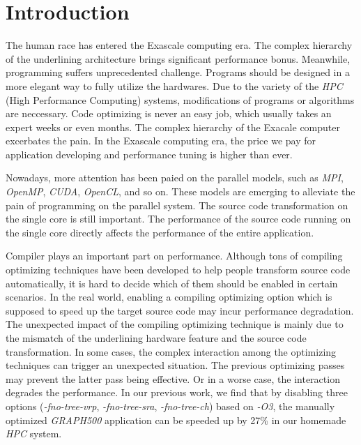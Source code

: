 \documentclass[bst/sn-mathphys]{sn-jnl}%
\theoremstyle{thmstyleone}%
\theoremstyle{thmstyletwo}%
\theoremstyle{thmstylethree}%
\begin{document}
\section{Introduction}\label{sec1}

The human race has entered the Exascale computing era. The complex hierarchy of 
the underlining architecture brings significant performance bonus. Meanwhile, 
programming suffers unprecedented challenge. Programs should be designed in 
a more elegant way to fully utilize the hardwares. Due to the
variety of the \emph{HPC} (High Performance Computing) systems, 
modifications of 
programs or algorithms are neccessary. Code optimizing is never an easy job, 
which usually takes an expert weeks or even months. The complex hierarchy of 
the Exacale computer excerbates the pain. In the Exascale computing era, the 
price we pay for application developing and performance tuning is higher 
than ever. 

Nowadays, more attention has been paied on the parallel models, such as 
\emph{MPI}, \emph{OpenMP}, \emph{CUDA}, \emph{OpenCL}, and so on. 
These models are emerging to alleviate the pain of 
programming on the parallel system. The source code 
transformation on the single core is still important. The performance 
of the source code running on the single core directly affects the performance 
of the entire application. 

Compiler plays an important part on performance. Although tons of compiling 
optimizing techniques have been developed to help people transform source code 
automatically, it is hard to decide which of them should be enabled in certain 
scenarios. In the real world, enabling a compiling optimizing option which is 
supposed to speed up the target source code may incur performance degradation. 
The unexpected impact of the compiling optimizing technique is 
mainly due to the mismatch of the underlining hardware feature and the source 
code transformation. In some cases, the complex interaction among the
optimizing techniques can trigger an unexpected situation. The previous 
optimizing passes may prevent the latter pass being effective. Or 
in a worse case, the interaction degrades the performance. In our previous 
work, we find that by disabling three options (\emph{-fno-tree-vrp}, 
\emph{-fno-tree-sra}, \emph{-fno-tree-ch}) based on \emph{-O3}, the 
manually optimized \emph{GRAPH500} application 
can be speeded up by 27\% in our homemade \emph{HPC} system.
\end{document}
